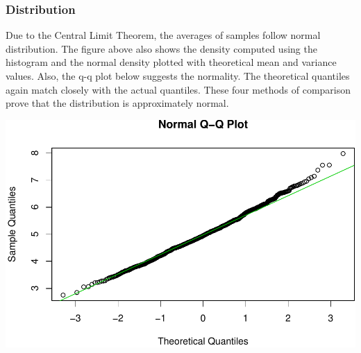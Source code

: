 \documentclass[]{article}
\newenvironment{Shaded}{\begin{snugshade}}{\end{snugshade}}
\newcommand{\KeywordTok}[1]{\textcolor[rgb]{0.13,0.29,0.53}{\textbf{{#1}}}}
\newcommand{\DataTypeTok}[1]{\textcolor[rgb]{0.13,0.29,0.53}{{#1}}}
\newcommand{\StringTok}[1]{\textcolor[rgb]{0.31,0.60,0.02}{{#1}}}
\newcommand{\NormalTok}[1]{{#1}}
\begin{document}
\subsubsection{Distribution}\label{distribution}

Due to the Central Limit Theorem, the averages of samples follow normal
distribution. The figure above also shows the density computed using the
histogram and the normal density plotted with theoretical mean and
variance values. Also, the q-q plot below suggests the normality. The
theoretical quantiles again match closely with the actual quantiles.
These four methods of comparison prove that the distribution is
approximately normal.

\begin{Shaded}
\end{Shaded}

\begin{center}\includegraphics{part1_files/figure-latex/plot1-1} \end{center}
\end{document}
